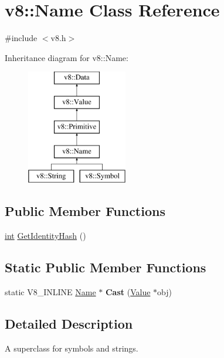 \hypertarget{classv8_1_1Name}{}\section{v8\+:\+:Name Class Reference}
\label{classv8_1_1Name}


{\ttfamily \#include $<$v8.\+h$>$}

Inheritance diagram for v8\+:\+:Name\+:\begin{figure}[H]
\begin{center}
\leavevmode
\includegraphics[height=5.000000cm]{classv8_1_1Name}
\end{center}
\end{figure}
\subsection*{Public Member Functions}
\begin{DoxyCompactItemize}
\item 
\mbox{\hyperlink{classint}{int}} \mbox{\hyperlink{classv8_1_1Name_aef60fce47685fad12914304f6bc52bf2}{Get\+Identity\+Hash}} ()
\end{DoxyCompactItemize}
\subsection*{Static Public Member Functions}
\begin{DoxyCompactItemize}
\item 
\mbox{\label{classv8_1_1Name_a38bb2124c25f5089afd5fc1f9e87066f}} 
static V8\+\_\+\+I\+N\+L\+I\+NE \mbox{\hyperlink{classv8_1_1Name}{Name}} $\ast$ {\bfseries Cast} (\mbox{\hyperlink{classv8_1_1Value}{Value}} $\ast$obj)
\end{DoxyCompactItemize}


\subsection{Detailed Description}
A superclass for symbols and strings. 

